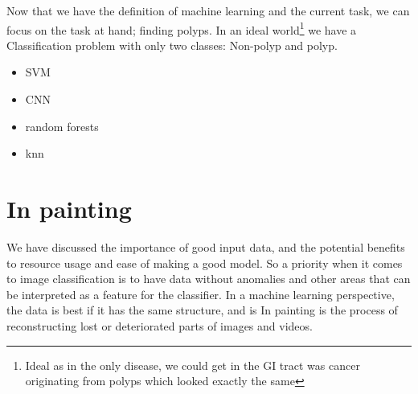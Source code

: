       Now that we have the definition of machine learning and the current task, we can focus on the task at hand; finding polyps. In an ideal world\footnote{Ideal as in the only disease, we could get in  the GI tract was cancer originating
      from polyps which looked exactly the same} we have a
      Classification problem with only two classes: Non-polyp and polyp. 
      
      \begin{itemize}
        \item SVM 
        \item CNN 
        \item random forests
        \item knn
      \end{itemize}


















































\iffalse
\section{In painting}
  We have discussed the importance of good input data, and the potential benefits to resource usage and ease of making a good model.
  So a priority when it comes to image classification is to have data without anomalies and other areas that can be interpreted as a feature for the classifier. 
  In a machine learning perspective, the data is best if it has the same structure, and is %
  In painting is the process of reconstructing lost or deteriorated parts of images and videos. %
  


